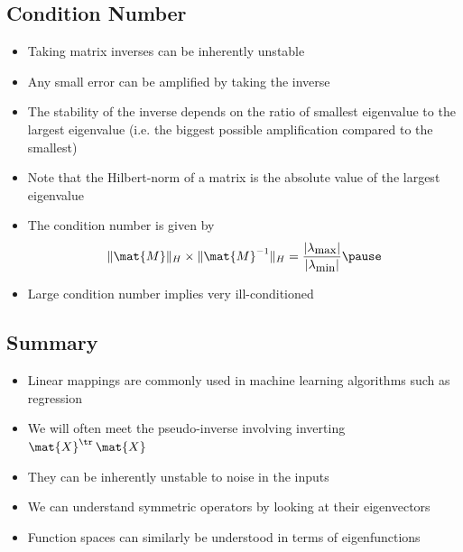
\begin{slide}
\section[-2]{Condition Number}

\begin{PauseHighLight}
  \begin{itemize}\squeeze
  \item Taking matrix inverses can be inherently unstable\pause
  \item Any small error can be amplified by taking the inverse\pause
  \item The stability of the inverse depends on the ratio of smallest
    eigenvalue to the largest eigenvalue (i.e. the biggest possible
    amplification compared to the smallest)\pause
  \item Note that the Hilbert-norm of a matrix is the absolute value of
    the largest eigenvalue\pause
  \item The condition number is given by
    \begin{align*}
      \|\mat{M}\|_H \times \|\mat{M}^{-1}\|_H =
      \frac{|\lambda_{\text{\small max}}|}{|\lambda_{\text{\small min}}|}\pause
    \end{align*}
  \item Large condition number implies very ill-conditioned\pause
  \end{itemize}
\end{PauseHighLight}

\end{slide}




\begin{slide}
\section{Summary}

\begin{PauseHighLight}
  \begin{itemize}
  \item Linear mappings are commonly used in machine learning algorithms
    such as regression\pause
  \item We will often meet the pseudo-inverse involving inverting
    $\mat{X}^\tr\,\mat{X}$\pause 
  \item They can be inherently unstable to noise in the inputs\pause
  \item We can understand symmetric operators by looking at their eigenvectors\pause
  \item Function spaces can similarly be understood in terms of eigenfunctions\pause
  \end{itemize}
\end{PauseHighLight}

\end{slide}


